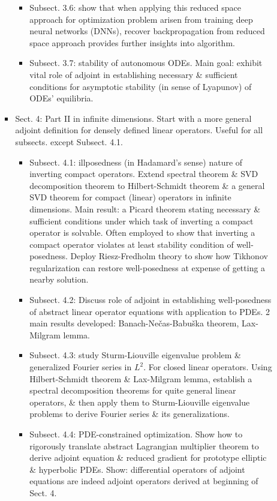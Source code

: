 \documentclass{article}
\begin{document}
\begin{enumerate}
\begin{itemize}
\begin{itemize}
\begin{itemize}
				\item Subsect. 3.6: show that when applying this reduced space approach for optimization problem arisen from training deep neural networks (DNNs), recover backpropagation from reduced space approach provides further insights into algorithm.
				\item Subsect. 3.7: stability of autonomous ODEs. Main goal: exhibit vital role of adjoint in establishing necessary \& sufficient conditions for asymptotic stability (in sense of Lyapunov) of ODEs' equilibria.
			\end{itemize}
			\item Sect. 4: Part II in infinite dimensions. Start with a more general adjoint definition for densely defined linear operators. Useful for all subsects. except Subsect. 4.1.
			\begin{itemize}
				\item Subsect. 4.1: illposedness (in Hadamard's sense) nature of inverting compact operators. Extend spectral theorem \& SVD decomposition theorem to Hilbert-Schmidt theorem \& a general SVD theorem for compact (linear) operators in infinite dimensions. Main result: a Picard theorem stating necessary \& sufficient conditions under which task of inverting a compact operator is solvable. Often employed to show that inverting a compact operator violates at least stability condition of well-posedness. Deploy Riesz-Fredholm theory to show how Tikhonov regularization can restore well-posedness at expense of getting a nearby solution.
				\item Subsect. 4.2: Discuss role of adjoint in establishing well-posedness of abstract linear operator equations with application to PDEs. 2 main results developed: Banach-Nečas-Babuška theorem, Lax-Milgram lemma.
				\item Subsect. 4.3: study Sturm-Liouville eigenvalue problem \& generalized Fourier series in $L^2$. For closed linear operators. Using Hilbert-Schmidt theorem \& Lax-Milgram lemma, establish a spectral decomposition theorems for quite general linear operators, \& then apply them to Sturm-Liouville eigenvalue problems to derive Fourier series \& its generalizations.
				\item Subsect. 4.4: PDE-constrained optimization. Show how to rigorously translate abstract Lagrangian multiplier theorem to derive adjoint equation \& reduced gradient for prototype elliptic \& hyperbolic PDEs. Show: differential operators of adjoint equations are indeed adjoint operators derived at beginning of Sect. 4.
			\end{itemize}

\end{itemize}
\end{itemize}
\end{enumerate}
\end{document}
